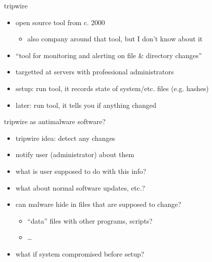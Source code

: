 \begin{frame}{tripwire}
    \begin{itemize}
    \item open source tool from c. 2000
        \begin{itemize}
        \item also company around that tool, but I don't know about it
        \end{itemize}
    \item ``tool for monitoring and alerting on file \& directory changes''
    \item targetted at servers with professional administrators
    \vspace{.5cm}
    \item setup: run tool, it records state of system/etc. files (e.g. hashes)
    \item later: run tool, it tells you if anything changed
    \end{itemize}
\end{frame}

\begin{frame}{tripwire as antimalware software?}
    \begin{itemize}
    \item tripwire idea: detect any changes
    \item notify user (administrator) about them
    \vspace{.5cm}
    \item what is user supposed to do with this info?
    \vspace{.5cm}
    \item what about normal software updates, etc.?
    \item can malware hide in files that are supposed to change?
        \begin{itemize}
        \item ``data'' files with other programs, scripts?
        \item \ldots
        \end{itemize}
    \item what if system compromised before setup?
    \end{itemize}
\end{frame}
